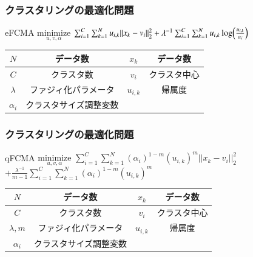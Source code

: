 \documentclass[13pt,dvipdfmx]{beamer}
\begin{document}
\begin{frame}\frametitle{クラスタリングの最適化問題}
  \begin{block}{eFCMA}
  \quad$\underset{u,v,\alpha}{\text{minimize}}$
    $\sum_{i=1}^C\sum_{k=1}^Nu_{i,k}||x_k-v_i||_2^2+\lambda^{-1}\sum_{i=1}^C\sum_{k=1}^Nu_{i,k}\log\Bigl(\frac{u_{i,k}}{\alpha_{i}}\Bigl)$
  \end{block}
  \begin{center}
\begin{tabular}{c||c|c||c} \hline
	{$N$}&データ数&{$x_k$}&データ数 \\ \hline
	{$C$}&クラスタ数&{$v_i$}&クラスタ中心\\ \hline
	{$\lambda$}&ファジィ化パラメータ&{$u_{i,k}$}&帰属度 \\ \hline
	{$\alpha_i$}&クラスタサイズ調整変数\\ \hline
\end{tabular}
\end{center}
\end{frame}

\begin{frame}\frametitle{クラスタリングの最適化問題}
  \begin{block}{qFCMA}
    \quad$\underset{u,v,\alpha}{\text{minimize}}$
    $\sum_{i=1}^C\sum_{k=1}^N(\alpha_{i})^{1-m}(u_{i,k})^m||x_k-v_i||_2^2$\\
    \qquad\qquad\qquad\qquad$+\frac{\lambda^{-1}}{m-1}\sum_{i=1}^C\sum_{k=1}^N(\alpha_{i})^{1-m}(u_{i,k})^m$
  \end{block}
  \begin{center}
\begin{tabular}{c||c|c||c} \hline
	{$N$}&データ数&{$x_k$}&データ数 \\ \hline
	{$C$}&クラスタ数&{$v_i$}&クラスタ中心\\ \hline
	{$\lambda,m$}&ファジィ化パラメータ&{$u_{i,k}$}&帰属度 \\ \hline
	{$\alpha_i$}&クラスタサイズ調整変数\\ \hline
\end{tabular}
\end{center}
  \end{frame}
\end{document}
